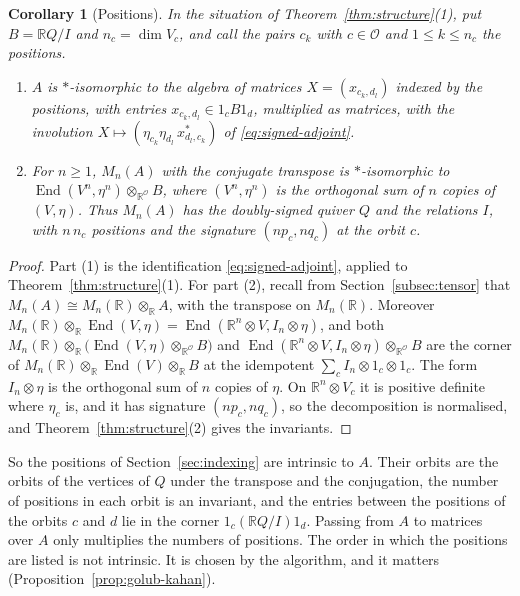 \documentclass[12pt, a4paper]{report}
\theoremstyle{plain}
\newtheorem{corollary}[theorem]{Corollary}
\theoremstyle{definition}
\theoremstyle{remark}
\theoremstyle{plain}
\newcommand{\RR}{\mathbb{R}}
\DeclareMathOperator{\End}{End}
\begin{document}
\begin{corollary}[Positions]\label{cor:positions}
In the situation of Theorem~\ref{thm:structure}(1), put $B=\RR Q/I$ and $n_c=\dim V_c$, and call the pairs $c_k$ with $c\in\mathcal O$ and $1\leq k\leq n_c$ the \emph{positions}.
\begin{enumerate}
  \item $A$ is $*$-isomorphic to the algebra of matrices $X=(x_{c_k,d_l})$ indexed by the positions, with entries $x_{c_k,d_l}\in1_cB1_d$, multiplied as matrices, with the involution $X\mapsto(\eta_{c_k}\eta_{d_l}\,x_{d_l,c_k}^*)$ of \eqref{eq:signed-adjoint}.
  \item For $n\geq1$, $M_n(A)$ with the conjugate transpose is $*$-isomorphic to $\End(V^n,\eta^n)\otimes_{\RR^{\mathcal O}}B$, where $(V^n,\eta^n)$ is the orthogonal sum of $n$ copies of $(V,\eta)$. Thus $M_n(A)$ has the doubly-signed quiver $Q$ and the relations $I$, with $n\,n_c$ positions and the signature $(np_c,nq_c)$ at the orbit $c$.
\end{enumerate}
\end{corollary}
\begin{proof}
Part (1) is the identification \eqref{eq:signed-adjoint}, applied to Theorem~\ref{thm:structure}(1). For part (2), recall from Section~\ref{subsec:tensor} that $M_n(A)\cong M_n(\RR)\otimes_\RR A$, with the transpose on $M_n(\RR)$. Moreover $M_n(\RR)\otimes_\RR\End(V,\eta)=\End(\RR^n\otimes V,I_n\otimes\eta)$, and both $M_n(\RR)\otimes_\RR\bigl(\End(V,\eta)\otimes_{\RR^{\mathcal O}}B\bigr)$ and $\End(\RR^n\otimes V,I_n\otimes\eta)\otimes_{\RR^{\mathcal O}}B$ are the corner of $M_n(\RR)\otimes_\RR\End(V)\otimes_\RR B$ at the idempotent $\sum_cI_n\otimes1_c\otimes1_c$. The form $I_n\otimes\eta$ is the orthogonal sum of $n$ copies of $\eta$. On $\RR^n\otimes V_c$ it is positive definite where $\eta_c$ is, and it has signature $(np_c,nq_c)$, so the decomposition is normalised, and Theorem~\ref{thm:structure}(2) gives the invariants.
\end{proof}

So the positions of Section~\ref{sec:indexing} are intrinsic to $A$. Their orbits are the orbits of the vertices of $Q$ under the transpose and the conjugation, the number of positions in each orbit is an invariant, and the entries between the positions of the orbits $c$ and $d$ lie in the corner $1_c(\RR Q/I)1_d$. Passing from $A$ to matrices over $A$ only multiplies the numbers of positions. The order in which the positions are listed is not intrinsic. It is chosen by the algorithm, and it matters (Proposition~\ref{prop:golub-kahan}).
\end{document}
